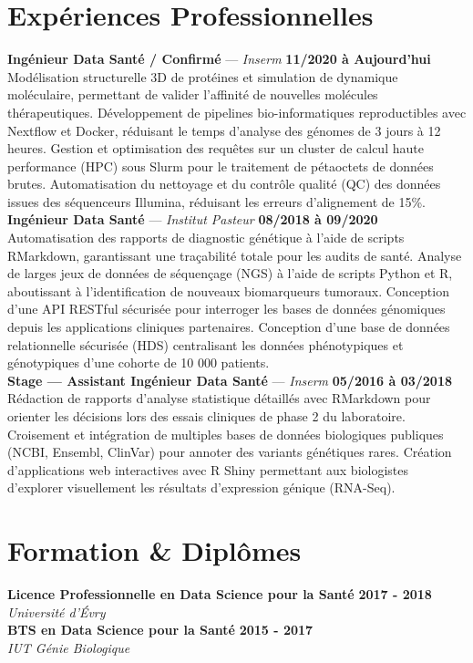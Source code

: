 \documentclass[11pt,a4paper]{article}
\begin{document}
\section*{Expériences Professionnelles}
\noindent \textbf{Ingénieur Data Santé / Confirmé} --- \textit{Inserm} \hfill \textbf{11/2020 à Aujourd'hui} \\
Modélisation structurelle 3D de protéines et simulation de dynamique moléculaire, permettant de valider l'affinité de nouvelles molécules thérapeutiques. Développement de pipelines bio-informatiques reproductibles avec Nextflow et Docker, réduisant le temps d'analyse des génomes de 3 jours à 12 heures. Gestion et optimisation des requêtes sur un cluster de calcul haute performance (HPC) sous Slurm pour le traitement de pétaoctets de données brutes. Automatisation du nettoyage et du contrôle qualité (QC) des données issues des séquenceurs Illumina, réduisant les erreurs d'alignement de 15\%. \\[0.3cm]
\noindent \textbf{Ingénieur Data Santé} --- \textit{Institut Pasteur} \hfill \textbf{08/2018 à 09/2020} \\
Automatisation des rapports de diagnostic génétique à l'aide de scripts RMarkdown, garantissant une traçabilité totale pour les audits de santé. Analyse de larges jeux de données de séquençage (NGS) à l'aide de scripts Python et R, aboutissant à l'identification de nouveaux biomarqueurs tumoraux. Conception d'une API RESTful sécurisée pour interroger les bases de données génomiques depuis les applications cliniques partenaires. Conception d'une base de données relationnelle sécurisée (HDS) centralisant les données phénotypiques et génotypiques d'une cohorte de 10 000 patients. \\[0.3cm]
\noindent \textbf{Stage — Assistant Ingénieur Data Santé} --- \textit{Inserm} \hfill \textbf{05/2016 à 03/2018} \\
Rédaction de rapports d'analyse statistique détaillés avec RMarkdown pour orienter les décisions lors des essais cliniques de phase 2 du laboratoire. Croisement et intégration de multiples bases de données biologiques publiques (NCBI, Ensembl, ClinVar) pour annoter des variants génétiques rares. Création d'applications web interactives avec R Shiny permettant aux biologistes d'explorer visuellement les résultats d'expression génique (RNA-Seq). \\[0.3cm]


\vspace{0.3cm}

\section*{Formation \& Diplômes}
\noindent \textbf{Licence Professionnelle en Data Science pour la Santé} \hfill \textbf{2017 - 2018} \\
\textit{Université d'Évry} \\[0.3cm]
\noindent \textbf{BTS en Data Science pour la Santé} \hfill \textbf{2015 - 2017} \\
\textit{IUT Génie Biologique} \\[0.3cm]
\end{document}
